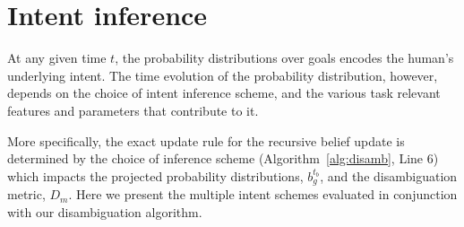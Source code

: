 \documentclass[letterpaper, 10 pt, conference]{ieeeconf}  %
\begin{document}
%		
%		
%		
%		
%		


\section{Intent inference}\label{sec:inference}
At any given time $t$, the probability distributions over goals encodes the human's underlying intent. The time evolution of the probability distribution, however, depends on the choice of intent inference scheme, and the various task relevant features and parameters that contribute to it. 

More specifically, the exact update rule for the recursive belief update is determined by the choice of inference scheme (Algorithm~\ref{alg:disamb}, Line 6) which impacts the projected probability distributions, $b_g^{t_b}$, and the disambiguation metric, $D_m$. Here we present the multiple intent schemes evaluated in conjunction with our disambiguation algorithm. 
\end{document}
